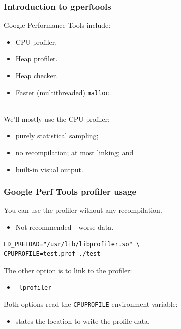 \begin{frame}
  \frametitle{Introduction to gperftools}


\begin{changemargin}{1.5cm}

    Google Performance Tools include:
      
      \begin{itemize}
        \item CPU profiler.
        \item Heap profiler.
        \item Heap checker.
        \item Faster (multithreaded) {\tt malloc}.
      \end{itemize}
~\\[-1em]
     We'll mostly use the CPU profiler:
      \begin{itemize}
        \item purely statistical sampling;
        \item no recompilation; at most linking; and
        \item built-in visual output.
      \end{itemize}
      \end{changemargin}
\end{frame}

\begin{frame}[fragile]
  \frametitle{Google Perf Tools profiler usage}

  

\begin{changemargin}{1.5cm}
    You can use the profiler without any recompilation.
      \begin{itemize}
        \item Not recommended---worse data.
      \end{itemize}

  \begin{lstlisting}
LD_PRELOAD="/usr/lib/libprofiler.so" \
CPUPROFILE=test.prof ./test
  \end{lstlisting}

     The other option is to link to the profiler:
      \begin{itemize}
        \item {\tt -lprofiler}
      \end{itemize}
    Both options read the {\tt CPUPROFILE} environment variable:
      \begin{itemize}
        \item states the location to write the profile data.
      \end{itemize}
      \end{changemargin}
\end{frame}

